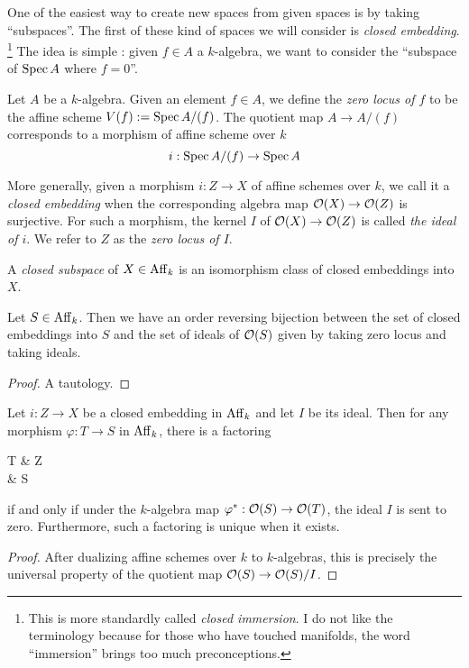 \documentclass[./main.tex]{subfiles}
\begin{document}
One of the easiest way to
create new spaces from given spaces is
by taking ``subspaces''.
The first of these kind of spaces
we will consider is \emph{closed embedding}.
\footnote{
  This is more standardly called \emph{closed immersion}.
  I do not like the terminology because
  for those who have touched manifolds,
  the word ``immersion'' brings too much preconceptions.
}
The idea is simple : 
given $f \in A$ a $k$-algebra,
we want to consider the ``subspace of $\operatorname{Spec} A$ where $f = 0$''.

\begin{dfn}
  
  Let $A$ be a $k$-algebra.
  Given an element $f \in A$,
  we define the \emph{zero locus of $f$} to be
  the affine scheme $V(f) := \operatorname{Spec} A / (f)$.
  The quotient map $A \to A / (f)$
  corresponds to a morphism of affine scheme over $k$ \[
    i : \operatorname{Spec} A / (f) \to \operatorname{Spec} A
  \]

  More generally,
  given a morphism $i : Z \to X$ of affine schemes over $k$,
  we call it a \emph{closed embedding} when
  the corresponding algebra map $\mathcal{O}(X) \to \mathcal{O}(Z)$ is surjective.
  For such a morphism,
  the kernel $I$ of $\mathcal{O}(X) \to \mathcal{O}(Z)$
  is called \emph{the ideal of $i$}.
  We refer to $Z$ as the \emph{zero locus of $I$}.

  A \emph{closed subspace} of $X \in \mathrm{Aff}_k$
  is an isomorphism class of closed embeddings into $X$.

\end{dfn}

\begin{prop}
  
  Let $S \in \mathrm{Aff}_k$.
  Then we have an order reversing
  bijection between
  the set of closed embeddings into $S$ and
  the set of ideals of $\mathcal{O}(S)$
  given by taking zero locus and taking ideals.
\end{prop}
\begin{proof}
  A tautology.
\end{proof}

\begin{prop}
  
  Let $i : Z \to X$ be a closed embedding in $\mathrm{Aff}_k$
  and let $I$ be its ideal.
  Then for any morphism $\varphi : T \to S$ in $\mathrm{Aff}_k$,
  there is a factoring \begin{cd}
    T & Z \\
    & S 
    \arrow[from = 1-1, to = 1-2 , dashed]
    \arrow[from = 1-2 , to = 2-2 , "{i}"]
    \arrow[from = 1-1 , to = 2-2 , "{\varphi}"']
  \end{cd}
  if and only if under the $k$-algebra map
  $\varphi^* : \mathcal{O}(S) \to \mathcal{O}(T)$,
  the ideal $I$ is sent to zero.
  Furthermore,
  such a factoring is unique when it exists.
\end{prop}
\begin{proof}
  After dualizing affine schemes over $k$
  to $k$-algebras,
  this is precisely the universal property
  of the quotient map $\mathcal{O}(S) \to \mathcal{O}(S) / I$.
\end{proof}
\end{document}
